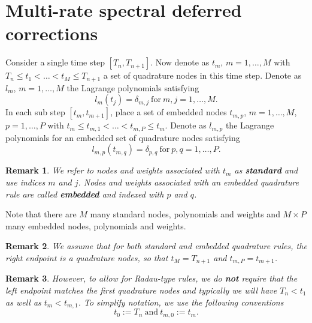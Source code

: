 \documentclass{article}
\newtheorem{remark}{Remark}
\begin{document}
\section*{Multi-rate spectral deferred corrections}
Consider a single time step $[T_{n}, T_{n+1}]$.
Now denote as $t_m$, $m=1, \ldots, M$ with $T_{n} \leq t_1 < \ldots < t_{M} \leq T_{n+1}$ a set of quadrature nodes in this time step.
Denote as $l_m$, $m=1, \ldots, M$ the Lagrange polynomials satisfying 
\begin{equation}
	l_m(t_j) = \delta_{m,j} \ \text{for} \ m,j=1, \ldots, M.
\end{equation}
In each sub step $[t_m, t_{m+1}]$, place a set of embedded nodes $t_{m,p}$, $m=1,\ldots,M$, $p=1,\ldots,P$ with $t_{m} \leq t_{m,1} < \ldots < t_{m,P} \leq t_{m}$.
Denote as $l_{m,p}$ the Lagrange polynomials for an embedded set of quadrature nodes satisfying
\begin{equation}
	l_{m,p}(t_{m,q}) = \delta_{p,q} \ \text{for} \ p,q=1,\ldots,P.
\end{equation}
\begin{remark}
We refer to nodes and weights associated with $t_m$ as \textbf{standard} and use indices $m$ and $j$.
Nodes and weights associated with an embedded quadrature rule are called \textbf{embedded} and indexed with $p$ and $q$.
\end{remark}
Note that there are $M$ many standard nodes, polynomials and weights and $M \times P$ many embedded nodes, polynomials and weights.
\begin{remark}
We assume that for both standard and embedded quadrature rules, the right endpoint is a quadrature nodes, so that $t_{M} = T_{n+1}$ and $t_{m,P} = t_{m+1}$.
\end{remark}
\begin{remark}
However, to allow for Radau-type rules, we do \textbf{not} require that the left endpoint matches the first quadrature nodes and typically we will have $T_n < t_1$ as well as $t_{m} < t_{m,1}$.
To simplify notation, we use the following conventions
\begin{equation}
	t_0 := T_n \ \text{and} \ t_{m,0} := t_{m}.
\end{equation}
\end{remark}
\end{document}
